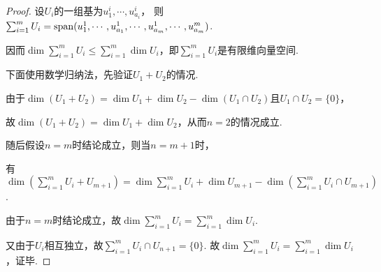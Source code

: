\begin{proof}
    设\(U_i\)的一组基为\(u_1^i,\cdots,u_{a_i}^i\)，
    则\(\sum_{i=1}^m U_i=\operatorname{span}(u_1^1,\cdots,u_{a_1}^1,\cdots,u_{a_m}^1,\cdots,u_{a_m}^m)\).

    因而\(\dim \sum_{i=1}^m U_i \leq \sum_{i=1}^m \dim U_i\)，即\(\sum_{i=1}^m U_i\)是有限维向量空间.

    下面使用数学归纳法，先验证\(U_1+U_2\)的情况.

    由于\(\dim (U_1+U_2)=\dim U_1+\dim U_2-\dim (U_1\cap U_2)\)且\(U_1\cap U_2=\{0\}\)，

    故\(\dim (U_1+U_2)=\dim U_1+\dim U_2\)，从而\(n=2\)的情况成立.

    随后假设\(n=m\)时结论成立，则当\(n=m+1\)时，

    有\(\dim (\sum_{i=1}^m U_i+U_{m+1})=\dim \sum_{i=1}^m U_i+\dim U_{m+1}-\dim (\sum_{i=1}^m U_i \cap U_{m+1})\).

    由于\(n=m\)时结论成立，故\(\dim \sum_{i=1}^m U_i=\sum_{i=1}^m \dim U_i\).

    又由于\(U_i\)相互独立，故\(\sum_{i=1}^m U_i \cap U_{n+1}=\{0\}\).
    故\(\dim \sum_{i=1}^m U_i=\sum_{i=1}^m \dim U_i\)，证毕.
\end{proof}

